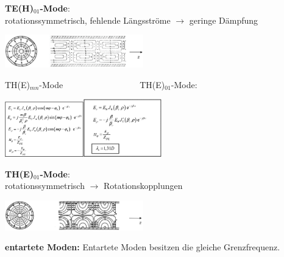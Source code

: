 \documentclass[english]{latex4ei/latex4ei_sheet}
\begin{document}
\begin{sectionbox}
	\textbf{TE(H)$_{01}$-Mode}:\\
	rotationssymmetrisch, fehlende Längsströme $\rightarrow$ geringe Dämpfung
	\begin{center}\includegraphics[width = 6cm]{./img/hl-rund-h01_2.png}\end{center}
	TH(E)$_{mn}$-Mode$\quad\quad\quad\quad\quad\quad\quad\quad\quad$TH(E)$_{01}$-Mode:
	\begin{center}\includegraphics[width = 3.4cm]{./img/hl-rund-emn.png}\includegraphics[width = 3.4cm]{./img/hl-rund-e01.png}\end{center}
	\textbf{TH(E)$_{01}$-Mode}:\\ 
	rotationssymmetrisch $\rightarrow$ Rotationskopplungen
	\begin{center}\includegraphics[width = 6cm]{./img/hl-rund-e01_2.png}\end{center}

\end{sectionbox}
\begin{sectionbox}
	\textbf{entartete Moden:}
	Entartete Moden besitzen die gleiche Grenzfrequenz.
\end{sectionbox}
\end{document}
